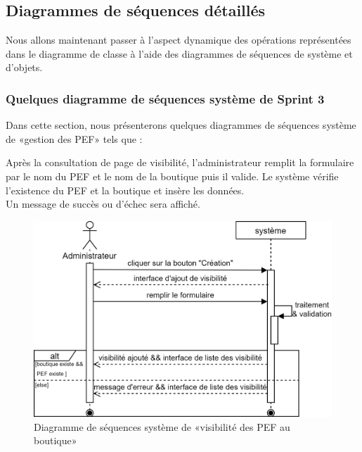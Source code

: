 \subsection{Diagrammes de séquences détaillés}
Nous allons maintenant passer à l’aspect dynamique des opérations représentées dans le diagramme de classe à l’aide des diagrammes de séquences de système et d’objets.
\subsubsection{Quelques diagramme de séquences système de Sprint 3}
Dans cette section, nous présenterons quelques diagrammes de séquences système de «gestion des PEF» tels que : \newpage

Après la consultation de page de visibilité, l'administrateur remplit la formulaire par le nom du PEF et le nom de la boutique puis il valide. Le système vérifie l'existence du PEF et la boutique et insère les données.\\
Un message de succès ou d'échec sera affiché.
	\begin{figure}[H]
		\centering
		\includegraphics[width=0.7\linewidth]{"img/conception/sequences/sprint 3/visibilite-system"}
		\caption[Diagramme de séquences système de «visibilité des PEF au boutique»]{Diagramme de séquences système de «visibilité des PEF au boutique»}
		\label{fig:visibilite-system}
	\end{figure}


